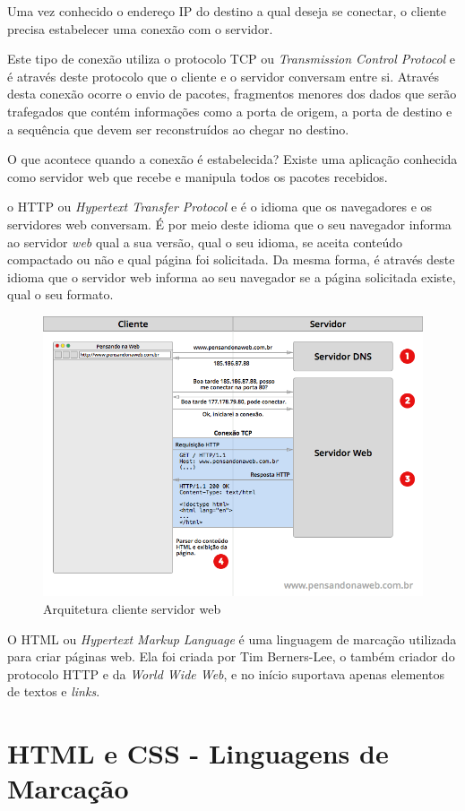 Uma vez conhecido o endereço IP do destino a qual deseja se conectar, o cliente precisa estabelecer uma conexão com o servidor.

Este tipo de conexão utiliza o protocolo TCP ou \textit{Transmission Control Protocol} e é através deste protocolo que o cliente e o servidor conversam entre si. Através desta conexão ocorre o envio de pacotes, fragmentos menores dos dados que serão trafegados que contém informações como a porta de origem, a porta de destino e a sequência que devem ser reconstruídos ao chegar no destino.

O que acontece quando a conexão é estabelecida? Existe uma aplicação conhecida como servidor web que recebe e manipula todos os pacotes recebidos.

o HTTP ou \textit{Hypertext Transfer Protocol} e é o idioma que os navegadores e os servidores web conversam. É por meio deste idioma que o seu navegador informa ao servidor \textit{web} qual a sua versão, qual o seu idioma, se aceita conteúdo compactado ou não e qual página foi solicitada. Da mesma forma, é através deste idioma que o servidor web informa ao seu navegador se a página solicitada existe, qual o seu formato.

\begin{figure}[H]
    \centering
    \includegraphics[width=0.7\linewidth]{dados/figuras/conexao}
    \caption{Arquitetura cliente servidor web}
    \label{fig:conexao}
\end{figure}

O HTML ou \textit{Hypertext Markup Language} é uma linguagem de marcação utilizada para criar páginas web. Ela foi criada por Tim Berners-Lee, o também criador do protocolo HTTP e da \textit{World Wide Web}, e no início suportava apenas elementos de textos e \textit{links}.

\section{HTML e CSS - Linguagens de Marcação}

